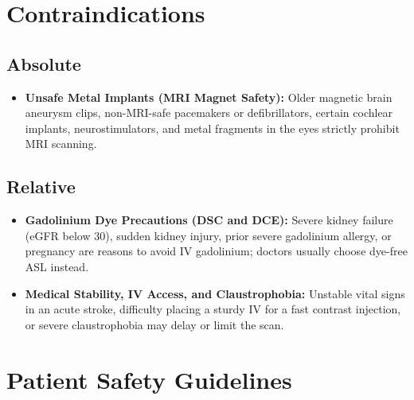 \section{Contraindications}

\subsection{Absolute}

\begin{itemize}
    \item \textbf{Unsafe Metal Implants (MRI Magnet Safety):} Older magnetic brain aneurysm clips, non-MRI-safe pacemakers or defibrillators, certain cochlear implants, neurostimulators, and metal fragments in the eyes strictly prohibit MRI scanning.
\end{itemize}

\subsection{Relative}

\begin{itemize}
    \item \textbf{Gadolinium Dye Precautions (DSC and DCE):} Severe kidney failure (eGFR below 30), sudden kidney injury, prior severe gadolinium allergy, or pregnancy are reasons to avoid IV gadolinium; doctors usually choose dye-free ASL instead.
    \item \textbf{Medical Stability, IV Access, and Claustrophobia:} Unstable vital signs in an acute stroke, difficulty placing a sturdy IV for a fast contrast injection, or severe claustrophobia may delay or limit the scan.
\end{itemize}

\section{Patient Safety Guidelines}

